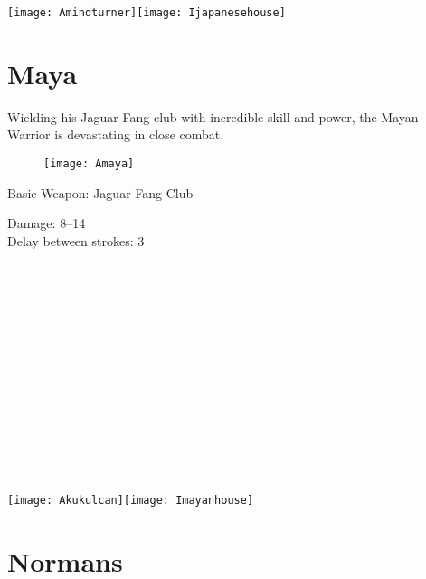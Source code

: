 \begin{center}
	\texttt{[image: Amindturner]}\hspace{1pt}\texttt{[image: Ijapanesehouse]}
\end{center}

\clearpage

\section{Maya}


Wielding his Jaguar Fang club with incredible skill and power, the Mayan Warrior is devastating in close combat.

\begin{wrapfigure}{r}{0.5\textwidth}
	\begin{center}
		\vspace{-20pt}
		\texttt{[image: Amaya]}
	\end{center}
	\vspace{-20pt}
\end{wrapfigure}

Basic Weapon: Jaguar Fang Club
\begin{adjustwidth}{1cm}{}
	Damage: 8–14 \\
	Delay between strokes: 3 \\ \\ \\ \\ \\ \\ \\ \\ \\ \\ \\ \\ \\ \\
\end{adjustwidth}

\begin{center}
	\texttt{[image: Akukulcan]}\hspace{1pt}\texttt{[image: Imayanhouse]}
\end{center}

\clearpage

\section{Normans}

